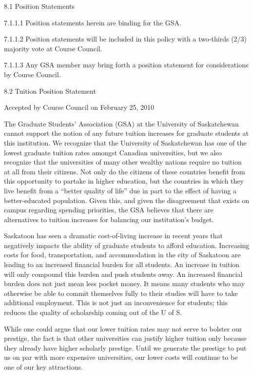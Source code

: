 ﻿8.1 Position Statements 
 
 7.1.1.1 Position statements herein are binding for the GSA. 
 
 7.1.1.2 Position statements will be included in this policy with a two-thirds (2/3) majority 
 vote at Course Council. 
 
 7.1.1.3 Any GSA member may bring forth a position statement for considerations by 
 Course Council. 
 
 8.2 Tuition Position Statement 
 
 Accepted by Course Council on February 25, 2010 
 
 The Graduate Students’ Association (GSA) at the University of Saskatchewan cannot 
 support the notion of any future tuition increases for graduate students at this institution. 
 We recognize that the University of Saskatchewan has one of the lowest graduate tuition 
 rates amongst Canadian universities, but we also recognize that the universities of many 
 other wealthy nations require no tuition at all from their citizens. Not only do the citizens 
 of these countries benefit from this opportunity to partake in higher education, but the 
 countries in which they live benefit from a “better quality of life” due in part to the effect 
 of having a better-educated population. Given this, and given the disagreement that exists 
 on campus regarding spending priorities, the GSA believes that there are alternatives to 
 tuition increases for balancing our institution’s budget. 
 
 Saskatoon has seen a dramatic cost-of-living increase in recent years that negatively 
 impacts the ability of graduate students to afford education. Increasing costs for food, 
 transportation, and accommodation in the city of Saskatoon are leading to an increased 
 financial burden for all students. An increase in tuition will only compound this burden 
 and push students away. An increased financial burden does not just mean less pocket 
 money. It means many students who may otherwise be able to commit themselves fully to 
 their studies will have to take additional employment. This is not just an inconvenience 
 for students; this reduces the quality of scholarship coming out of the U of S. 
 
 While one could argue that our lower tuition rates may not serve to bolster our prestige, 
 the fact is that other universities can justify higher tuition only because they already have 
 higher scholarly prestige. Until we generate the prestige to put us on par with more 
 expensive universities, our lower costs will continue to be one of our key attractions. 
 

